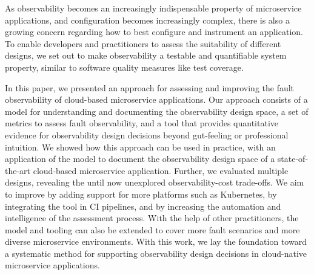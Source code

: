 As observability becomes an increasingly indispensable property of microservice applications, and configuration becomes increasingly complex, there is also a growing concern regarding how to best configure and instrument an application. To enable developers and practitioners to assess the suitability of different designs, we set out to make observability a testable and quantifiable system property, similar to software quality measures like test coverage.  

In this paper, we presented an approach for assessing and improving the fault observability of cloud-based microservice applications. Our approach consists of a model for understanding and documenting the observability design space, a set of metrics to assess fault observability, and a tool that provides quantitative evidence for observability design decisions beyond gut-feeling or professional intuition.
We showed how this approach can be used in practice, with an application of the model to document the observability design space of a state-of-the-art cloud-based microservice application. Further, we evaluated multiple designs, revealing the until now unexplored observability-cost trade-offs.
We aim to improve \name{} by adding support for more platforms such as Kubernetes, by integrating the tool in CI pipelines, and by increasing the automation and intelligence of the assessment process.
With the help of other practitioners, the model and tooling can also be extended to cover more fault scenarios and more diverse microservice environments. With this work, we lay the foundation toward a systematic method for supporting observability design decisions in cloud-native microservice applications.

